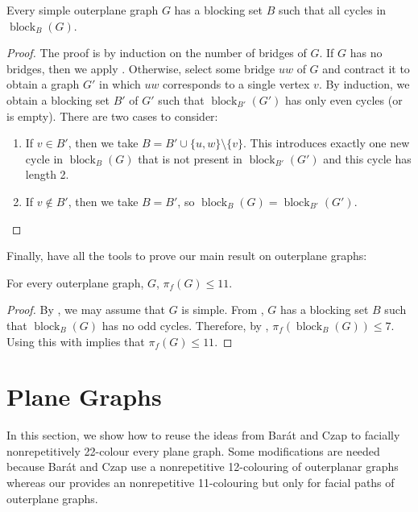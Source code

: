 \documentclass{patmorin}
\DeclareMathOperator{\block}{block}
\begin{document}
\begin{lem}
  Every simple outerplane graph $G$ has a blocking set $B$ such that all cycles
  in $\block_B(G)$. 
\end{lem}

\begin{proof}
  The proof is by induction on the number of bridges of $G$.  If $G$
  has no bridges, then we apply .  Otherwise,
  select some bridge $uw$ of $G$ and contract it to obtain a graph $G'$
  in which $uw$ corresponds to a single vertex $v$.  By induction,
  we obtain a blocking set $B'$ of $G'$ such that $\block_{B'}(G')$
  has only even cycles (or is empty).  There are two cases to consider:
  \begin{enumerate}
    \item If $v\in B'$, then we take $B=B'\cup\{u,w\}\setminus\{v\}$. This introduces exactly one new cycle in $\block_B(G)$ that is not present in $\block_{B'}(G')$ and this cycle has length 2.

    \item If $v\not\in B'$, then we take $B=B'$, so
    $\block_B(G)=\block_{B'}(G')$. \qedhere
  \end{enumerate}
\end{proof}

Finally, have all the tools to prove our main result on outerplane graphs:

\begin{thm}
  For every outerplane graph, $G$, $\pi_f(G)\le 11$.
\end{thm}

\begin{proof}
By , we may assume that $G$ is simple.  From
, $G$ has a blocking set $B$ such that $\block_B(G)$
has no odd cycles.  Therefore, by , $\pi_f(\block_B(G))\le
7$.  Using this with  implies that $\pi_f(G)\le 11$.
\end{proof}



\section{Plane Graphs}

In this section, we show how to reuse the ideas from Bar\'at and Czap
\cite{bcXX} to facially nonrepetitively 22-colour every plane graph.
Some modifications are needed because Bar\'at and Czap use a nonrepetitive
12-colouring of outerplanar graphs whereas our  provides an
nonrepetitive 11-colouring but only for facial paths of outerplane graphs.
\end{document}
